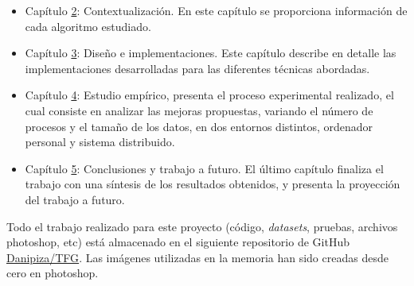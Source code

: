 	
	\begin{itemize}
		\item Capítulo \hyperref[cap:c2_context]{2}: Contextualización. En este capítulo se proporciona información de cada algoritmo estudiado.
		\item Capítulo \hyperref[cap:c3_implementaciones]{3}: Diseño e implementaciones. Este capítulo describe en detalle las implementaciones desarrolladas para las diferentes técnicas abordadas.
		\item Capítulo \hyperref[cap:c4_estudio]{4}: Estudio empírico, presenta el proceso experimental realizado, el cual consiste en analizar las mejoras propuestas, variando el número de procesos y el tamaño de los datos, en dos entornos distintos, ordenador personal y sistema distribuido.
		\item Capítulo \hyperref[cap:c5_conclu]{5}: Conclusiones y trabajo a futuro. El último capítulo finaliza el trabajo con una síntesis  de los resultados obtenidos, y presenta la proyección del trabajo a futuro.
	\end{itemize}
	
	Todo el trabajo realizado para este proyecto (código, \textit{datasets}, pruebas, archivos photoshop, etc) está almacenado en el siguiente repositorio de GitHub \href{https://github.com/Danipiza/TFG}{Danipiza/TFG}. Las imágenes utilizadas en la memoria han sido creadas desde cero en photoshop.
	

















